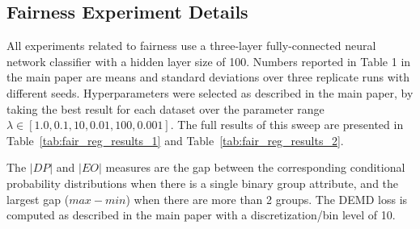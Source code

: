 \subsection{Fairness Experiment Details}
All experiments related to fairness use a three-layer fully-connected neural network classifier with a hidden layer size of 100. Numbers reported in Table 1 in the main paper are means and standard deviations over three replicate runs with different seeds.
Hyperparameters were selected as described in the main paper,
by taking the best result for each dataset over the parameter range $\lambda \in [1.0, 0.1, 10, 0.01, 100, 0.001]$. The full results of this sweep are presented in Table~\ref{tab:fair_reg_results_1} and Table~\ref{tab:fair_reg_results_2}.

The $|DP|$ and $|EO|$ measures are the gap between the corresponding conditional probability distributions when there is a single binary group attribute, and the largest gap ($max - min$) when there are more than 2 groups. The DEMD loss is computed as described in the main paper with a discretization/bin level of 10.



